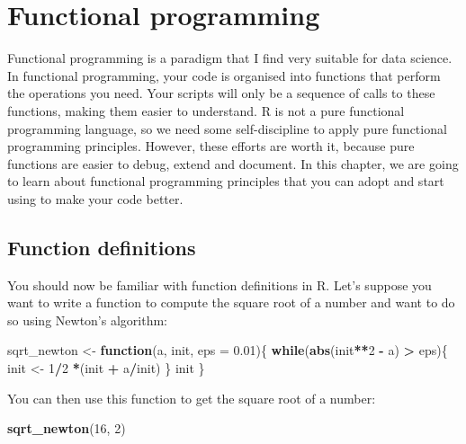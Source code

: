 \documentclass[
]{article}
\newenvironment{Shaded}{\begin{snugshade}}{\end{snugshade}}
\newcommand{\ControlFlowTok}[1]{\textcolor[rgb]{0.13,0.29,0.53}{\textbf{#1}}}
\newcommand{\DataTypeTok}[1]{\textcolor[rgb]{0.13,0.29,0.53}{#1}}
\newcommand{\DecValTok}[1]{\textcolor[rgb]{0.00,0.00,0.81}{#1}}
\newcommand{\FloatTok}[1]{\textcolor[rgb]{0.00,0.00,0.81}{#1}}
\newcommand{\KeywordTok}[1]{\textcolor[rgb]{0.13,0.29,0.53}{\textbf{#1}}}
\newcommand{\NormalTok}[1]{#1}
\newcommand{\OperatorTok}[1]{\textcolor[rgb]{0.81,0.36,0.00}{\textbf{#1}}}
\newcommand{\StringTok}[1]{\textcolor[rgb]{0.31,0.60,0.02}{#1}}
\begin{document}
\hypertarget{functional-programming}{%
\section{Functional programming}\label{functional-programming}}

Functional programming is a paradigm that I find very suitable for data science. In functional
programming, your code is organised into functions that perform the operations you need. Your scripts
will only be a sequence of calls to these functions, making them easier to understand. R is not a pure
functional programming language, so we need some self-discipline to apply pure functional programming
principles. However, these efforts are worth it, because pure functions are easier to debug, extend
and document. In this chapter, we are going to learn about functional programming principles that you
can adopt and start using to make your code better.

\hypertarget{function-definitions}{%
\subsection{Function definitions}\label{function-definitions}}

You should now be familiar with function definitions in R. Let's suppose you want to write a function
to compute the square root of a number and want to do so using Newton's algorithm:

\begin{Shaded}
\begin{Highlighting}[]
\NormalTok{sqrt\_newton \textless{}{-}}\StringTok{ }\ControlFlowTok{function}\NormalTok{(a, init, }\DataTypeTok{eps =} \FloatTok{0.01}\NormalTok{)\{}
    \ControlFlowTok{while}\NormalTok{(}\KeywordTok{abs}\NormalTok{(init}\OperatorTok{**}\DecValTok{2} \OperatorTok{{-}}\StringTok{ }\NormalTok{a) }\OperatorTok{\textgreater{}}\StringTok{ }\NormalTok{eps)\{}
\NormalTok{        init \textless{}{-}}\StringTok{ }\DecValTok{1}\OperatorTok{/}\DecValTok{2} \OperatorTok{*}\NormalTok{(init }\OperatorTok{+}\StringTok{ }\NormalTok{a}\OperatorTok{/}\NormalTok{init)}
\NormalTok{    \}}
\NormalTok{    init}
\NormalTok{\}}
\end{Highlighting}
\end{Shaded}

You can then use this function to get the square root of a number:

\begin{Shaded}
\begin{Highlighting}[]
\KeywordTok{sqrt\_newton}\NormalTok{(}\DecValTok{16}\NormalTok{, }\DecValTok{2}\NormalTok{)}
\end{Highlighting}
\end{Shaded}
\end{document}
